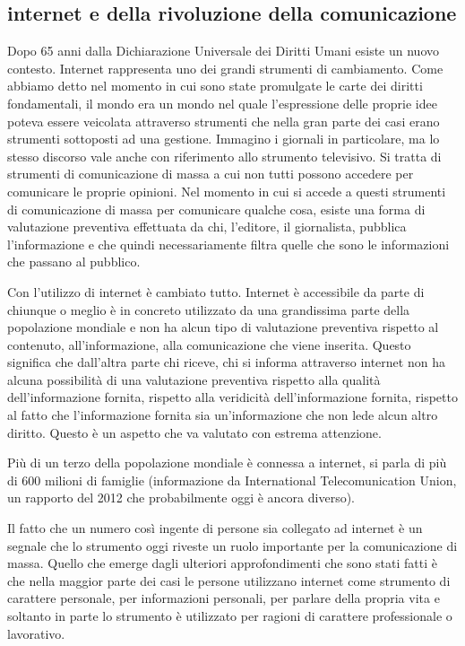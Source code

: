 \subsection{internet e della rivoluzione della comunicazione}
Dopo 65 anni dalla Dichiarazione Universale dei Diritti Umani esiste un nuovo contesto. Internet rappresenta uno dei grandi strumenti di cambiamento. Come abbiamo detto nel momento in cui sono state promulgate le carte dei diritti fondamentali, il mondo era un mondo nel quale l'espressione delle proprie idee poteva essere veicolata attraverso strumenti che nella gran parte dei casi erano strumenti sottoposti ad una gestione. Immagino i giornali in particolare, ma lo stesso discorso vale anche con riferimento allo strumento televisivo. Si tratta di strumenti di comunicazione di massa a cui non tutti possono accedere per comunicare le proprie opinioni. Nel momento in cui si accede a questi strumenti di comunicazione di massa per comunicare qualche cosa, esiste una forma di valutazione preventiva effettuata da chi, l'editore, il giornalista, pubblica l'informazione e che quindi necessariamente filtra quelle che sono le informazioni che passano al pubblico.\par
Con l'utilizzo di internet è cambiato tutto. Internet è accessibile da parte di chiunque o meglio è in concreto utilizzato da una grandissima parte della popolazione mondiale e non ha alcun tipo di valutazione preventiva rispetto al contenuto, all'informazione, alla comunicazione che viene inserita. Questo significa che dall'altra parte chi riceve, chi si informa attraverso internet non ha alcuna possibilità di una valutazione preventiva rispetto alla qualità dell'informazione fornita, rispetto alla veridicità dell'informazione fornita, rispetto al fatto che l'informazione fornita sia un'informazione che non lede alcun altro diritto. Questo è un aspetto che va valutato con estrema attenzione.\par 
Più di un terzo della popolazione mondiale è connessa a internet, si parla di più di 600 milioni di famiglie (informazione da International Telecomunication Union, un rapporto del 2012 che probabilmente oggi è ancora diverso).\par
Il fatto che un numero così ingente di persone sia collegato ad internet è un segnale che lo strumento oggi riveste un ruolo importante per la comunicazione di massa. Quello che emerge dagli ulteriori approfondimenti che sono stati fatti è che nella maggior parte dei casi le persone utilizzano internet come strumento di carattere personale, per informazioni personali, per parlare della propria vita e soltanto in parte lo strumento è utilizzato per ragioni di carattere professionale o lavorativo.\par
